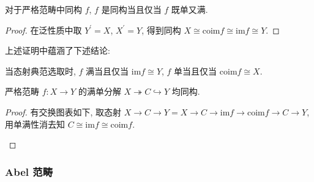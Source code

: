 \begin{lemma}
    对于严格范畴中同构 \(f\), \(f\) 是同构当且仅当 \(f\) 既单又满.

    \begin{proof}
        在泛性质中取 \(Y^\prime = X\), \(X^\prime = Y\), 得到同构 \(X \cong \mathrm{coim} f \cong \mathrm{im} f \cong Y\).
    \end{proof}
\end{lemma}

\begin{remark}
    上述证明中蕴涵了下述结论:

    当态射典范选取时, \(f\) 满当且仅当 \(\mathrm{im} f \cong Y\), \(f\) 单当且仅当 \(\mathrm{coim} f \cong X\).
\end{remark}

\begin{lemma}
    严格范畴 \(f : X \to Y\) 的满单分解 \(X \twoheadrightarrow C \hookrightarrow Y\) 均同构.

    \begin{proof}
        有交换图表如下, 取态射 \(X \to C \to Y = X \to C \to \mathrm{im} f \to \mathrm{coim} f \to C \to Y\), 用单满性消去知 \(C \cong \mathrm{im} f \cong \mathrm{coim} f\).
        \begin{center}
        \end{center}
    \end{proof}
\end{lemma}

\subsubsection{Abel 范畴}

